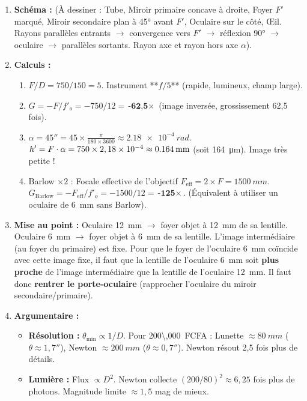 \documentclass[11pt]{article}
\begin{document}
\begin{corrige}
\begin{enumerate}
    \item \textbf{Schéma :} (À dessiner : Tube, Miroir primaire concave à droite, Foyer $F'$ marqué, Miroir secondaire plan à 45° avant $F'$, Oculaire sur le côté, Œil. Rayons parallèles entrants $\to$ convergence vers $F'$ $\to$ réflexion 90° $\to$ oculaire $\to$ parallèles sortants. Rayon axe et rayon hors axe $\alpha$).
    \item \textbf{Calculs :}
    \begin{enumerate}
        \item $F/D = 750 / 150 = 5$. Instrument **$f/5$** (rapide, lumineux, champ large).
        \item $G = -F/f'_o = -750 / 12 = \textbf{-62,5$\times$}$ (image inversée, grossissement 62,5 fois).
        \item $\alpha = 45'' = 45 \times \frac{\pi}{180 \times 3600} \approx \SI{2,18e-4}{rad}$.
        $h' = F \cdot \alpha = 750 \times 2,18 \times 10^{-4} \approx \textbf{\SI{0,164}{mm}}$ (soit \SI{164}{\micro\meter}). Image très petite !
        \item Barlow $\times 2$ : Focale effective de l'objectif $F_{\text{eff}} = 2 \times F = \SI{1500}{mm}$.
        $G_{\text{Barlow}} = -F_{\text{eff}} / f'_o = -1500 / 12 = \textbf{-125$\times$}$. (Équivalent à utiliser un oculaire de \SI{6}{mm} sans Barlow).
    \end{enumerate}
    \item \textbf{Mise au point :} Oculaire \SI{12}{mm} $\to$ foyer objet à \SI{12}{mm} de sa lentille. Oculaire \SI{6}{mm} $\to$ foyer objet à \SI{6}{mm} de sa lentille. L'image intermédiaire (au foyer du primaire) est fixe. Pour que le foyer de l'oculaire \SI{6}{mm} coïncide avec cette image fixe, il faut que la lentille de l'oculaire \SI{6}{mm} soit \textbf{plus proche} de l'image intermédiaire que la lentille de l'oculaire \SI{12}{mm}. Il faut donc \textbf{rentrer le porte-oculaire} (rapprocher l'oculaire du miroir secondaire/primaire).
    \item \textbf{Argumentaire :}
    \begin{itemize}
        \item \textbf{Résolution :} $\theta_{\text{min}} \propto 1/D$. Pour \SI{200\,000}{FCFA} : Lunette $\approx \SI{80}{mm}$ ($\theta \approx 1,7''$), Newton $\approx \SI{200}{mm}$ ($\theta \approx 0,7''$). Newton résout 2,5 fois plus de détails.
        \item \textbf{Lumière :} Flux $\propto D^2$. Newton collecte $(200/80)^2 \approx 6,25$ fois plus de photons. Magnitude limite $\approx 1,5$ mag de mieux.

\end{itemize}
\end{enumerate}
\end{corrige}
\end{document}
